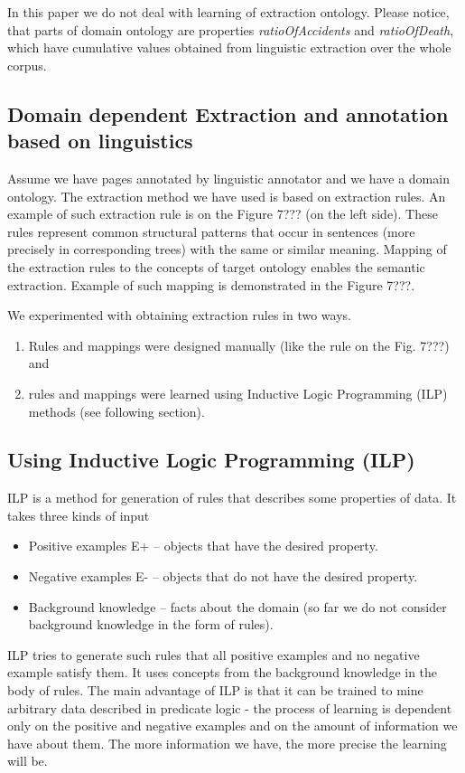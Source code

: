 \documentclass{sig-alternate}
\begin{document}
In this paper we do not deal with learning of extraction ontology. Please notice, that parts of domain ontology are properties \emph{ratioOfAccidents} and \emph{ratioOfDeath}, which have cumulative values obtained from linguistic extraction over the whole corpus. 

\subsection{Domain dependent Extraction and annotation based on linguistics}

Assume we have pages annotated by linguistic annotator and we have a domain ontology. The extraction method we have used is based on extraction rules. An example of such extraction rule is on the Figure 7??? (on the left side). These rules represent common structural patterns that occur in sentences (more precisely in corresponding trees) with the same or similar meaning. Mapping of the extraction rules to the concepts of target ontology enables the semantic extraction. Example of such mapping is demonstrated in the Figure 7???.

We experimented with obtaining extraction rules in two ways.
\begin{enumerate}
\item Rules and mappings were designed manually (like the rule on the Fig. 7???) and 
\item rules and mappings were learned using Inductive Logic Programming (ILP) methods (see following section).
\end{enumerate}


\subsection{Using Inductive Logic Programming (ILP)}
ILP is a method for generation of rules that describes some properties of data. It takes three kinds of input
\begin{itemize}
	\item Positive examples E+ -- objects that have the desired property.
	\item Negative examples E- -- objects that do not have the desired property.
	\item Background knowledge -- facts about the domain (so far we do not consider background knowledge in the form of rules).
\end{itemize}

ILP tries to generate such rules that all positive examples and no negative example satisfy them. It uses concepts from the background knowledge in the body of rules.
The main advantage of ILP is that it can be trained to mine arbitrary data described in predicate logic - the process of learning is dependent only on the positive and negative examples and on the amount of information we have about them. The more information we have, the more precise the learning will be. 
\end{document}
